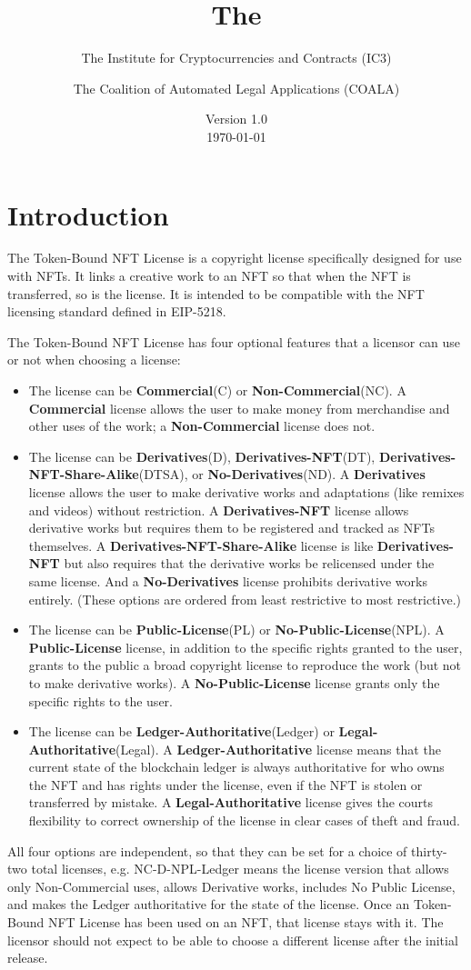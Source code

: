 \documentclass{article}
\title{The \iccclicense\\}
\author{The Institute for Cryptocurrencies and Contracts (IC3) \and The Coalition of Automated Legal Applications (COALA)}
\date{Version 1.0\\\today}
\newcommand{\eiplicense}{EIP-5218\xspace}
\newcommand{\iccclicense}{Token-Bound NFT License\xspace}
\newcommand{\keyword}[1]{\textbf{#1}\xspace}
\newcommand{\publiclicense}{\keyword{Public-License}}
\newcommand{\nopubliclicense}{\keyword{No-Public-License}}
\newcommand{\commercial}{\keyword{Commercial}}
\newcommand{\noncommercial}{\keyword{Non-Commercial}}
\newcommand{\noderivative}{\keyword{No-Derivatives}}
\newcommand{\derivative}{\keyword{Derivatives}}
\newcommand{\derivativetracking}{\keyword{Derivatives-NFT}}
\newcommand{\sharealike}{\keyword{Derivatives-NFT-Share-Alike}}
\newcommand{\ledger}{\keyword{Ledger-Authoritative}}
\newcommand{\legal}{\keyword{Legal-Authoritative}}
\begin{document}
\maketitle

\tableofcontents

\section{Introduction}

The \iccclicense is a copyright license specifically designed for use with NFTs. It links a creative work to an NFT so that when the NFT is transferred, so is the license. It is intended to be compatible with the NFT licensing standard defined in \eiplicense. 

The \iccclicense has four optional features that a licensor can use or not when choosing a license:
\begin{itemize}
\item The license can be \commercial (C) or \noncommercial (NC). A \commercial license allows the user to make money from merchandise and other uses of the work; a \noncommercial license does not.
\item The license can be \derivative (D), \derivativetracking (DT), \sharealike (DTSA), or \noderivative (ND). A \derivative license allows the user to make derivative works and adaptations (like remixes and videos) without restriction. A \derivativetracking license allows derivative works but requires them to be registered and tracked as NFTs themselves. A \sharealike license is like \derivativetracking but also requires that the derivative works be relicensed under the same license. And a \noderivative license prohibits derivative works entirely. (These options are ordered from least restrictive to most restrictive.)
\item The license can be \publiclicense (PL) or \nopubliclicense (NPL). A \publiclicense license, in addition to the specific rights granted to the user, grants to the public a broad copyright license to reproduce the work (but not to make derivative works). A \nopubliclicense license grants only the specific rights to the user.
\item The license can be \ledger (Ledger) or \legal (Legal). A \ledger license means that the current state of the blockchain ledger is always authoritative for who owns the NFT and has rights under the license, even if the NFT is stolen or transferred by mistake. A \legal license gives the courts flexibility to correct ownership of the license in clear cases of theft and fraud. 
\end{itemize}
All four options are independent, so that they can be set for a choice of thirty-two total licenses, e.g. NC-D-NPL-Ledger means the license version that allows only Non-Commercial uses, allows Derivative works, includes No Public License, and makes the Ledger authoritative for the state of the license. Once an \iccclicense has been used on an NFT, that license stays with it. The licensor should not expect to be able to choose a different license after the initial release.
\end{document}

